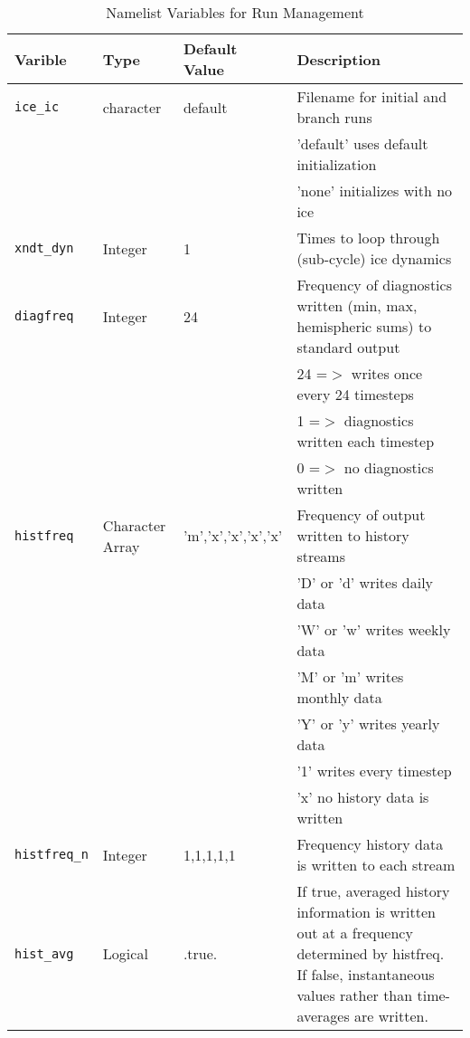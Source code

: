 \begin{table}[ht]
  \begin{center}
  \caption{Namelist Variables for Run Management}
  \label{table:setup_nml}
   \begin{tabular}{p{2.0cm}p{2.0cm}p{4.0cm}p{6.5cm}} \hline
Varible  & Type & Default Value & Description               \\

\hline \hline

{\tt ice\_ic}&  character  & default & Filename for initial and branch runs \\
             &             &         & 'default' uses default initialization \\
             &             &         & 'none' initializes with no ice \\

{\tt xndt\_dyn}&  Integer  & 1 & Times to loop through (sub-cycle) ice dynamics \\

{\tt diagfreq} &  Integer &  24 & Frequency of diagnostics written
                     (min, max, hemispheric sums) to standard output   \\
         &          &     & 24  =$>$ writes once every 24 timesteps  \\
         &          &     & 1  =$>$ diagnostics written each timestep \\
         &          &     & 0  =$>$ no diagnostics written \\

{\tt histfreq} & Character Array & 'm','x','x','x','x' & 
                            Frequency of output written to history streams \\
         &          &     & 'D' or 'd' writes daily data \\
         &          &     & 'W' or 'w' writes weekly data \\
         &          &     & 'M' or 'm' writes monthly data \\
         &          &     & 'Y' or 'y' writes yearly data \\
         &          &     & '1' writes every timestep \\
         &          &     & 'x' no history data is written \\

{\tt histfreq\_n} & Integer & 1,1,1,1,1 & Frequency history data is written to each stream \\

{\tt hist\_avg}  &  Logical & .true. & If true, averaged history
                       information is written out at a frequency
                       determined by histfreq.  If false, instantaneous
                       values rather than time-averages are written. \\


\end{tabular}
\end{center}
\end{table}
